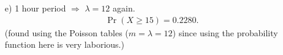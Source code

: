 \documentclass[12pt]{article}
\begin{document}
{\begin{minipage}[t]{0.98\textwidth}
\begin{minipage}[t]{0.47\textwidth}
\begin{enumerate}[a)]
    $X \sim \text{Poisson}(12)$ for a 1 hour period. Thus:\\[-0.4cm]
    \begin{align*}
    E(X) &= \lambda = 12 \text{ customers.}\\
    Var(X) &= \lambda = 12 \text{ customers$^2$.}\\
    Sd(X) &= \sqrt{Var(X)} = \sqrt{12} = 3.46 \text{ customers.}
    \end{align*}
\item[e)] 1 hour period $\Rightarrow$ $\lambda = 12$ again.
\begin{align*}
\Pr(X \ge 15) = 0.2280.
\end{align*}
{\footnotesize(found using the Poisson tables ($m = \lambda = 12$) since using the probability function here is very laborious.)}
\end{enumerate}
\end{minipage}
\end{minipage}}\vspace{0.03\textwidth}
\end{document}
